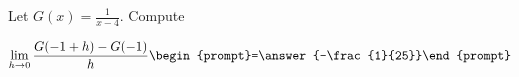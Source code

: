 \documentclass{ximera}
\author{Bart Snapp}
\begin{document}
\begin{exercise}
Let $G(x) = \frac{1}{x-4}$. Compute

\[
\lim_{ h\to 0 } \frac{G(-1+h)-G(-1)}{h} \begin{prompt}=\answer{-\frac{1}{25}}\end{prompt}
\]
\end{exercise}
\end{document}
